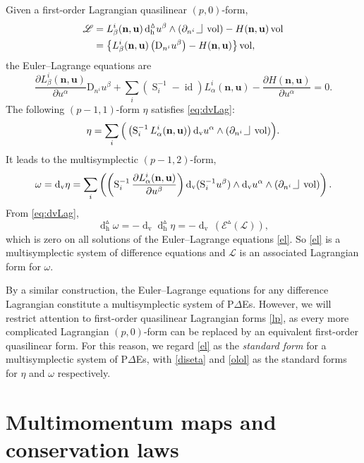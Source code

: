 \documentclass[11pt]{article} %
\numberwithin{equation}{section}
\newcommand{\intpsym}{\,\, \setlength{\unitlength}{0.4mm}
	\begin{picture}(0, 0)(5, 5)%
	\put(0, 4){\line(1,0){5}} \put(5,4){\line(0,1){8}}
	\end{picture}\,\,}
\newcommand{\intp}{\,\,\intpsym}
\newcommand{\es}{\operatorname{S}}
\newcommand{\id}{\operatorname{id}}
\newcommand{\volf}{\operatorname{vol}}
\newcommand{\upd}{\operatorname{d}}
\newcommand{\uph}{\operatorname{h}}
\newcommand{\upv}{\operatorname{v}}
\newcommand{\dv}{\upd_{\upv}\!}
\newcommand{\diffi}{\mathrm{D}_{n^i}}
\newcommand{\pde}{P$\Delta$E}
\newcommand{\mbn}{\mathbf{n}}
\newcommand{\mbu}{\mathbf{u}}
\newcommand{\mcE}{\mathcal{E}}
\newcommand{\msL}{\mathscr{L}}
\newcommand{\dDh}{\upd^{\vartriangle}_{\uph}}
\theoremstyle{plain}
\theoremstyle{definition}
\begin{document}
Given a first-order
Lagrangian quasilinear $(p,0)$-form,
\begin{equation}
\begin{aligned}
\label{lp}
\msL&=L_{\beta}^i(\mbn,\mbu)\dDh\!u^{\beta}
\wedge(\partial_{n^i}\intp\volf)-H(\mbn,\mbu)
\volf\\
&=
\left\{L_{\beta}^i(\mbn,\mbu)\left(\diffi u^{\beta}\right)-H(\mbn,\mbu)\right\}
\volf,
\end{aligned}
\end{equation}
the Euler--Lagrange equations are
\begin{equation}
\label{el} 
\frac{\partial L_{\beta}^i(\mbn,\mbu)}{\partial
u^{\alpha}}\diffi u^{\beta}+
\sum_i{(\es_i^{-1}-\id)L_{\alpha}^i(\mbn,\mbu)}-\frac{\partial
H(\mbn,\mbu)}{\partial u^{\alpha}}=0.
\end{equation}
The following $(p-1,1)$-form $\eta$ satisfies
\eqref{eq:dvLag}:
\begin{equation}\label{diseta}
\eta=\sum_{i}\Big(\left(\es_i^{-1}L_{\alpha}^i(\mbn,\mbu)\right)\dv 
u^{\alpha}\wedge(\partial_{n^i}\intp\volf)\Big).
\end{equation}
It leads to the multisymplectic $(p-1,2)$-form,
\begin{equation}\label{olol}
\omega=\dv \eta
=\sum_{i}\left(\left(\es_i^{-1}\frac{\partial
L_{\alpha}^i(\mbn,\mbu)}{\partial u^{\beta}}\right)
\dv\,(\es_i^{-1}\!u^{\beta})
\wedge\dv u^{\alpha}\wedge
(\partial_{n^i}\intp\volf)\right).
\end{equation}
From \eqref{eq:dvLag},
\begin{equation}
    \dDh\omega=-\dv \dDh\eta=-\dv\,(\mcE^{\vartriangle}(\msL)),
\end{equation}
which is zero on all solutions of the Euler--Lagrange equations \eqref{el}. So \eqref{el} is a multisymplectic system of difference equations and $\msL$ is an associated Lagrangian form for $\omega$.

By a similar construction, the Euler--Lagrange equations for any difference Lagrangian constitute a multisymplectic system of \pde{s}. However, we will restrict attention to first-order quasilinear Lagrangian forms \eqref{lp}, as every more complicated Lagrangian $(p,0)$-form can be replaced by an equivalent first-order quasilinear form. For this reason, we regard \eqref{el} as the \textit{standard form} for a multisymplectic system of \pde{s}, with \eqref{diseta} and \eqref{olol} as the standard forms for $\eta$ and $\omega$ respectively.

\section{Multimomentum maps and conservation laws}
\label{sec:mommap}
\end{document}
